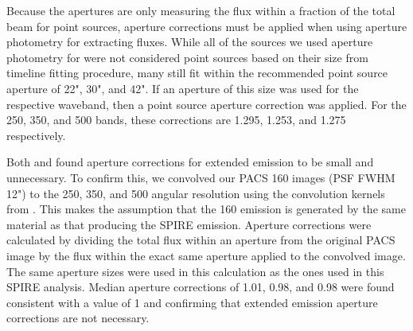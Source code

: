 Because the apertures are only measuring the flux within a fraction of the total beam for point sources, aperture corrections must be applied when using aperture photometry for extracting fluxes. While all of the sources we used aperture photometry for were not considered point sources based on their size from timeline fitting procedure, many still fit within the recommended point source aperture of 22", 30", and 42". If an aperture of this size was used for the respective waveband, then a point source aperture correction was applied. For the 250, 350, and 500 \um{} bands, these corrections are 1.295, 1.253, and 1.275 respectively. 

Both \citet{Ciesla:2012lq} and \citet{Dale:2012dq} found aperture corrections for extended emission to be small and unnecessary.  To confirm this, we convolved our PACS 160 \um{} images (PSF FWHM 12") to the 250, 350, and 500 \um{} angular resolution using the convolution kernels from \citet{Aniano:2011rr}. This makes the assumption that the 160 \um{} emission is generated by the same material as that producing the SPIRE emission. Aperture corrections were calculated by dividing the total flux within an aperture from the original PACS image by the flux within the exact same aperture applied to the convolved image. The same aperture sizes were used in this calculation as the ones used in this SPIRE analysis. Median aperture corrections of 1.01, 0.98, and 0.98 were found consistent with a value of 1 and confirming that extended emission aperture corrections are not necessary.

